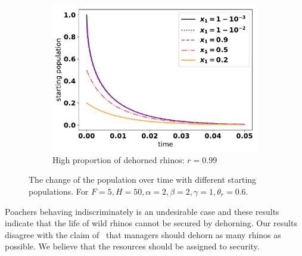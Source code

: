 \documentclass[10pt]{article}
\begin{document}
\begin{figure}[!htbp]
\begin{subfigure}{.3\textwidth}
    \includegraphics[width=\textwidth]{images/IndiscriminateESS-high-r.pdf}
    \caption{High proportion of dehorned rhinos: \(r=0.99\)}
    \end{subfigure}%
    \caption{\label{fig:indiscriminate_ess} The change of the population over 
    time with different starting populations. For \(F=5, H=50,  
    \alpha=2, \beta=2, \gamma=1, \theta_r=0.6\).}
\end{figure}

Poachers behaving indiscriminately is an undesirable case and these results
indicate that the life of
wild rhinos cannot be secured by dehorning. Our results disagree with the
claim of~\cite{Milner1992} that managers should dehorn
as many rhinos as possible. We believe that the resources should be 
assigned to security.



\end{document}
